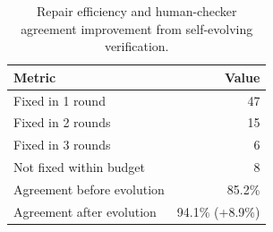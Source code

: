 \begin{table}
\vspace{-1.3em}
\centering
\small
\setlength{\tabcolsep}{3pt}
\caption{Repair efficiency and human-checker agreement improvement from self-evolving verification.}
\vspace{-0.5em}
\label{tab:self_evolution_rounds}
\begin{tabular}{lr}
\toprule
Metric & Value \\
\midrule
Fixed in 1 round & 47 \\
Fixed in 2 rounds & 15 \\
Fixed in 3 rounds & 6 \\
Not fixed within budget & 8 \\
\midrule
Agreement before evolution & 85.2\% \\
Agreement after evolution & 94.1\% (+8.9\%) \\
\bottomrule
\end{tabular}
\vspace{-1.0em}
\end{table}